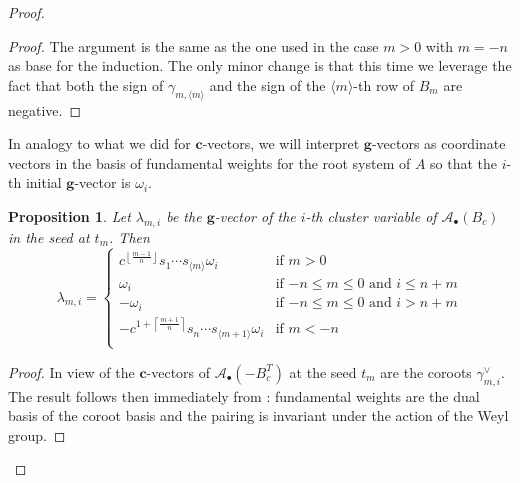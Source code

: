 \documentclass[12pt]{amsart}
\newcommand{\cAb}{\mathcal{A}_\bullet}
\newcommand{\bfc}{\mathbf{c}}
\newcommand{\bfg}{\mathbf{g}}
\renewcommand{\mod}[1]{\langle {#1} \rangle}
\newtheorem{proposition}[theorem]{Proposition}
\theoremstyle{remark}
\numberwithin{equation}{section}
\begin{document}
\begin{proof}
\begin{proof}
  The argument is the same as the one used in the case $m>0$ with $m=-n$ as base for the induction. 
  The only minor change is that this time we leverage the fact that both the sign of $\gamma_{m,\mod{m}}$ and the sign of the $\mod{m}$-th row of $B_m$ are negative.
\end{proof}

In analogy to what we did for $\bfc$-vectors, we will interpret $\bfg$-vectors as coordinate vectors in the basis of fundamental weights for the root system of $A$ so that the $i$-th initial $\bfg$-vector is $\omega_i$.
\begin{proposition}
  \label{prop:g-vectors}
  Let $\lambda_{m,i}$ be the $\bfg$-vector of the $i$-th cluster variable of $\cAb(B_c)$ in the seed at $t_m$. 
  Then
  \begin{equation}
    \lambda_{m,i}
    =
    \begin{cases}
      c^{\left\lfloor\frac{m-1}{n}\right\rfloor}s_1\cdots s_{\mod{m}} \omega_i & \text{if $m>0$}\\
      \omega_i & \text{if $-n\leq m \leq 0$ and  $i\leq n+m$} \\
      -\omega_i & \text{if $-n\leq m \leq 0$ and $i>n+m$} \\
      -c^{1+\left\lceil\frac{m+1}{n}\right\rceil}s_n\cdots s_{\mod{m+1}} \omega_i & \text{if $m <-n$}\\
    \end{cases}
  \end{equation}
\end{proposition}

\begin{proof}
  In view of  the $\bfc$-vectors of $\cAb(-B_c^T)$ at the seed $t_m$ are the coroots $\gamma_{m,i}^\vee$.
  The result follows then immediately from \cite[Theorem 1.2]{NZ12}: fundamental weights are the dual basis of the coroot basis and the pairing is invariant under the action of the Weyl group.
\end{proof}


\end{proof}
\end{document}
